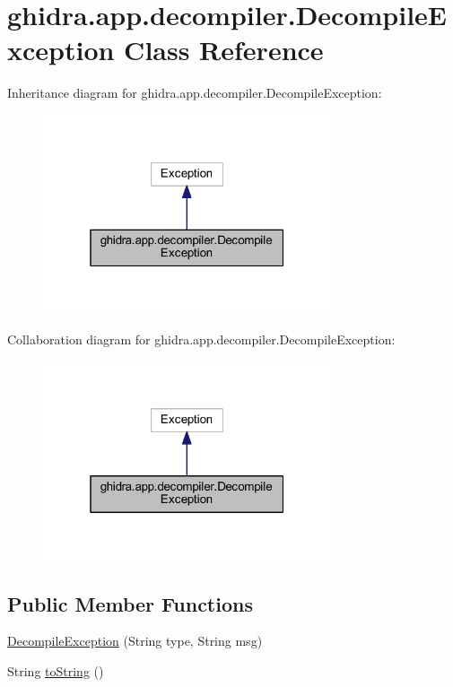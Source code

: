 \hypertarget{classghidra_1_1app_1_1decompiler_1_1_decompile_exception}{}\section{ghidra.\+app.\+decompiler.\+Decompile\+Exception Class Reference}
\label{classghidra_1_1app_1_1decompiler_1_1_decompile_exception}


Inheritance diagram for ghidra.\+app.\+decompiler.\+Decompile\+Exception\+:
\nopagebreak
\begin{figure}[H]
\begin{center}
\leavevmode
\includegraphics[width=241pt]{classghidra_1_1app_1_1decompiler_1_1_decompile_exception__inherit__graph}
\end{center}
\end{figure}


Collaboration diagram for ghidra.\+app.\+decompiler.\+Decompile\+Exception\+:
\nopagebreak
\begin{figure}[H]
\begin{center}
\leavevmode
\includegraphics[width=241pt]{classghidra_1_1app_1_1decompiler_1_1_decompile_exception__coll__graph}
\end{center}
\end{figure}
\subsection*{Public Member Functions}
\begin{DoxyCompactItemize}
\item 
\mbox{\hyperlink{classghidra_1_1app_1_1decompiler_1_1_decompile_exception_a49b1b5b199409dbdd36fd42b01083a90}{Decompile\+Exception}} (String type, String msg)
\item 
String \mbox{\hyperlink{classghidra_1_1app_1_1decompiler_1_1_decompile_exception_a32e1a91ab921c4d569e8e520ea16d5cb}{to\+String}} ()
\end{DoxyCompactItemize}


